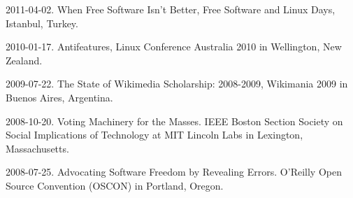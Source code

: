 \documentclass[10pt]{article}
\newenvironment{cvlist}{
\begin{list}{}{\leftmargin=3.0em \itemindent=-3.0em}
  \setlength{\itemsep}{0pt}
  \setlength{\parskip}{0em}
  \setlength{\parsep}{1em}
  \setlength{\parindent}{0em}}
{\vspace{1em}
\end{list}}
\begin{document}
\begin{cvlist}
\item 2011-04-02. When Free Software Isn't Better, Free Software and Linux Days, Istanbul, Turkey.
\item 2010-01-17. Antifeatures, Linux Conference Australia 2010 in Wellington, New Zealand. %
\item 2009-07-22. The State of Wikimedia Scholarship: 2008-2009, Wikimania 2009 in Buenos Aires, Argentina.
\item 2008-10-20. Voting Machinery for the Masses. IEEE Boston Section Society on Social Implications of Technology at MIT Lincoln Labs in Lexington, Massachusetts.
\item 2008-07-25. Advocating Software Freedom by Revealing Errors. O'Reilly Open Source Convention (OSCON) in Portland, Oregon. %

\end{cvlist}
\end{document}
